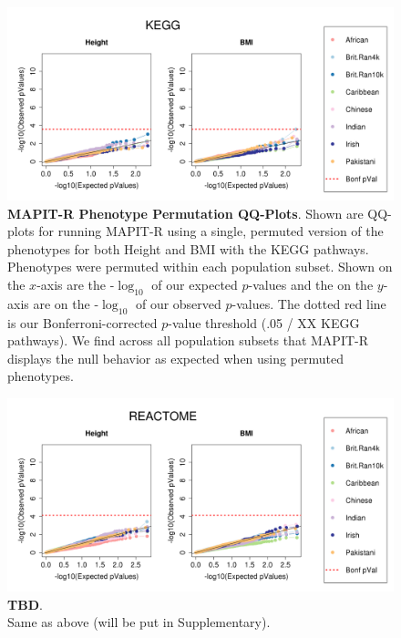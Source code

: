 \documentclass[12pt, a4paper]{article}
\begin{document}
\begin{figure}[htbp]
\centering
\includegraphics[scale=.35]{Images/Supp/InterPath_Supp_Figure_perm1_QQPlots_KEGG_vs1.png}
\caption[TBD]{\textbf{MAPIT-R Phenotype Permutation QQ-Plots}. Shown are QQ-plots for running MAPIT-R using a single, permuted version of the phenotypes for both Height and BMI with the KEGG pathways. Phenotypes were permuted within each population subset. Shown on the $x$-axis are the -$\log_{10}$ of our expected $p$-values and the on the $y$-axis are on the -$\log_{10}$ of our observed $p$-values. The dotted red line is our Bonferroni-corrected $p$-value threshold (.05 / XX KEGG pathways). We find across all population subsets that MAPIT-R displays the null behavior as expected when using permuted phenotypes.}
\label{InterPath-Supp-Figure-perm1-QQPlots-KEGG}
\end{figure}
\clearpage

\begin{figure}[htbp]
\centering
\includegraphics[scale=.35]{Images/Supp/InterPath_Supp_Figure_perm1_QQPlots_REACTOME_vs1.png}
\caption[TBD]{\textbf{TBD}. \\ Same as above (will be put in Supplementary).}
\label{InterPath-Supp-Figure-perm1-QQPlots-REACTOME}
\end{figure}
\clearpage
\end{document}
